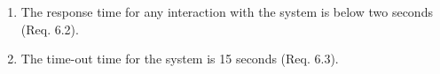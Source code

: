 \documentclass[a4paper]{article}
\newlength{\testlabellength}
\newenvironment{testlist}{\begin{enumerate}[label=\bfseries Instruction \thesubsection.\arabic* , labelindent=0pt, labelwidth=\testlabellength , leftmargin=2cm]}{\end{enumerate}}
\newenvironment{precondition}{
{\color{white}BLARG}\\ 
\textbf{Precondition}
\begin{itemize}[labelindent=0cm, labelwidth=2cm , leftmargin=1cm]
}
{\end{itemize}}
\newenvironment{instruction}{
\textbf{Instructions:}
\begin{enumerate}[label=\bfseries  \arabic*., labelindent=0cm, labelwidth=2cm , leftmargin=1cm]
}
{\end{enumerate}}
\newenvironment{postcondition}{
\textbf{Postcondition:}
\begin{itemize}[labelindent=0cm, labelwidth=2cm , leftmargin=1cm]
}
{\end{itemize}}
\begin{document}
\begin{appendices}
\begin{testlist}
	\item The response time for any interaction with the system is below two seconds (Req. 6.2).

	\item The time-out time for the system is 15 seconds (Req. 6.3). 
	
\end{testlist}

\clearpage

\end{appendices}
\end{document}

